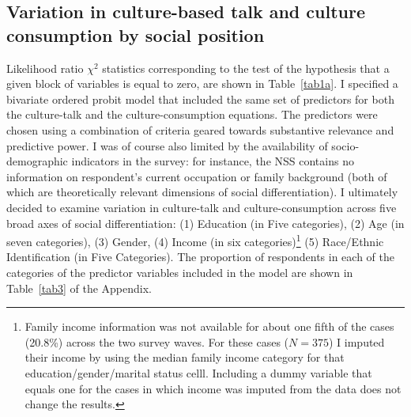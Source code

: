 \documentclass[11pt]{article}
\begin{document}
\subsection{Variation in culture-based talk and culture consumption by social position}
Likelihood ratio $\chi^{2}$ statistics corresponding to the test of the hypothesis that a given block of variables is equal to zero, are shown in Table~\ref{tab1a}.  I specified a bivariate ordered probit model that included the same set of predictors for both the culture-talk and the culture-consumption equations. The predictors were chosen  using a combination of criteria geared towards substantive relevance and predictive power. I was of course also limited by the availability of socio-demographic indicators in the survey: for instance, the NSS contains no information on respondent's current occupation or family background (both of which are theoretically relevant dimensions of social differentiation). I ultimately decided to examine variation in culture-talk and culture-consumption across five broad axes of social differentiation: (1) Education (in Five categories), (2) Age (in seven categories), (3) Gender, (4) Income (in six categories)\footnote{Family income information was not available for about one fifth of the cases (20.8\%) across the two survey waves.  For these cases ($N=375$) I imputed their income by using the median family income category for that education/gender/marital status celll.  Including a dummy variable that equals one for the cases in which income was imputed from the data does not change the results.} (5) Race/Ethnic Identification (in Five Categories). The proportion of respondents in each of the categories of the predictor variables included in the model are shown in Table~\ref{tab3} of the Appendix. 
\end{document}
